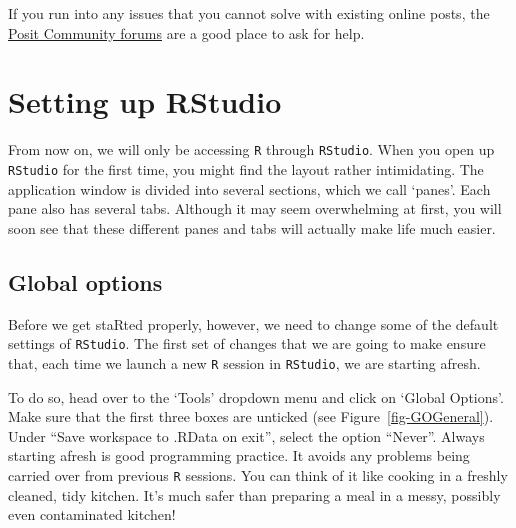\documentclass[
  letterpaper,
  DIV=11,
  numbers=noendperiod]{scrreprt}
\begin{document}
If you run into any issues that you cannot solve with existing online
posts, the \href{https://forum.posit.co/}{Posit Community forums} are a
good place to ask for help.

\section{Setting up RStudio}\label{setting-up-rstudio}

From now on, we will only be accessing \texttt{R} through
\texttt{RStudio}. When you open up \texttt{RStudio} for the first time,
you might find the layout rather intimidating. The application window is
divided into several sections, which we call `panes'. Each pane also has
several tabs. Although it may seem overwhelming at first, you will soon
see that these different panes and tabs will actually make life much
easier.

\subsection{Global options}\label{global-options}

Before we get staRted properly, however, we need to change some of the
default settings of \texttt{RStudio}. The first set of changes that we
are going to make ensure that, each time we launch a new \texttt{R}
session in \texttt{RStudio}, we are starting afresh.

To do so, head over to the `Tools' dropdown menu and click on `Global
Options'. Make sure that the first three boxes are unticked (see
Figure~\ref{fig-GOGeneral}). Under ``Save workspace to .RData on exit'',
select the option ``Never''. Always starting afresh is good programming
practice. It avoids any problems being carried over from previous
\texttt{R} sessions. You can think of it like cooking in a freshly
cleaned, tidy kitchen. It's much safer than preparing a meal in a messy,
possibly even contaminated kitchen!
\end{document}
